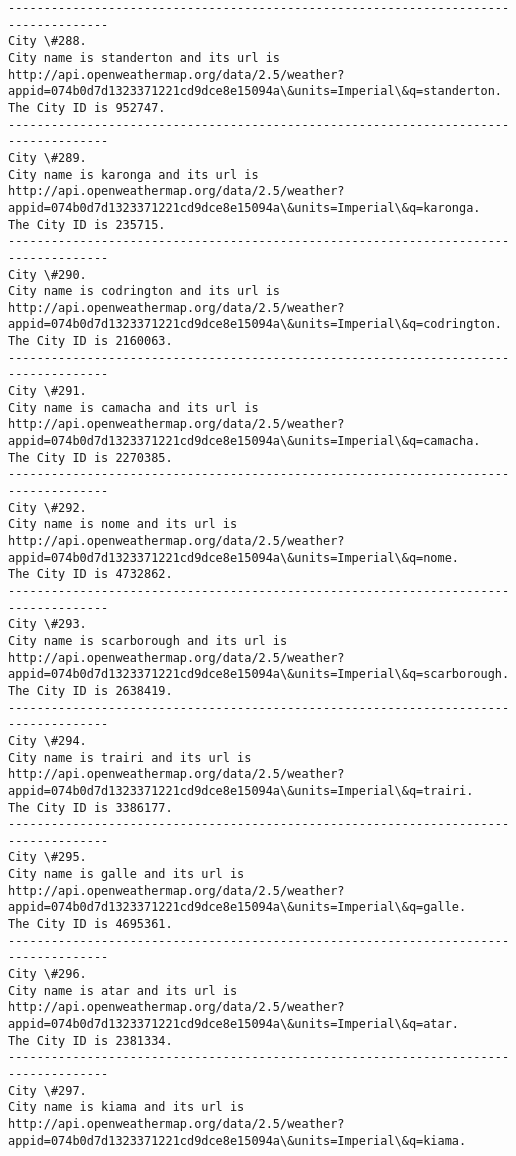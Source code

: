 \documentclass[11pt]{article}
\begin{document}
\begin{Verbatim}[commandchars=\\\{\}]
------------------------------------------------------------------------------------
City \#288.
City name is standerton and its url is http://api.openweathermap.org/data/2.5/weather?appid=074b0d7d1323371221cd9dce8e15094a\&units=Imperial\&q=standerton.
The City ID is 952747.
------------------------------------------------------------------------------------
City \#289.
City name is karonga and its url is http://api.openweathermap.org/data/2.5/weather?appid=074b0d7d1323371221cd9dce8e15094a\&units=Imperial\&q=karonga.
The City ID is 235715.
------------------------------------------------------------------------------------
City \#290.
City name is codrington and its url is http://api.openweathermap.org/data/2.5/weather?appid=074b0d7d1323371221cd9dce8e15094a\&units=Imperial\&q=codrington.
The City ID is 2160063.
------------------------------------------------------------------------------------
City \#291.
City name is camacha and its url is http://api.openweathermap.org/data/2.5/weather?appid=074b0d7d1323371221cd9dce8e15094a\&units=Imperial\&q=camacha.
The City ID is 2270385.
------------------------------------------------------------------------------------
City \#292.
City name is nome and its url is http://api.openweathermap.org/data/2.5/weather?appid=074b0d7d1323371221cd9dce8e15094a\&units=Imperial\&q=nome.
The City ID is 4732862.
------------------------------------------------------------------------------------
City \#293.
City name is scarborough and its url is http://api.openweathermap.org/data/2.5/weather?appid=074b0d7d1323371221cd9dce8e15094a\&units=Imperial\&q=scarborough.
The City ID is 2638419.
------------------------------------------------------------------------------------
City \#294.
City name is trairi and its url is http://api.openweathermap.org/data/2.5/weather?appid=074b0d7d1323371221cd9dce8e15094a\&units=Imperial\&q=trairi.
The City ID is 3386177.
------------------------------------------------------------------------------------
City \#295.
City name is galle and its url is http://api.openweathermap.org/data/2.5/weather?appid=074b0d7d1323371221cd9dce8e15094a\&units=Imperial\&q=galle.
The City ID is 4695361.
------------------------------------------------------------------------------------
City \#296.
City name is atar and its url is http://api.openweathermap.org/data/2.5/weather?appid=074b0d7d1323371221cd9dce8e15094a\&units=Imperial\&q=atar.
The City ID is 2381334.
------------------------------------------------------------------------------------
City \#297.
City name is kiama and its url is http://api.openweathermap.org/data/2.5/weather?appid=074b0d7d1323371221cd9dce8e15094a\&units=Imperial\&q=kiama.

\end{Verbatim}
\end{document}
